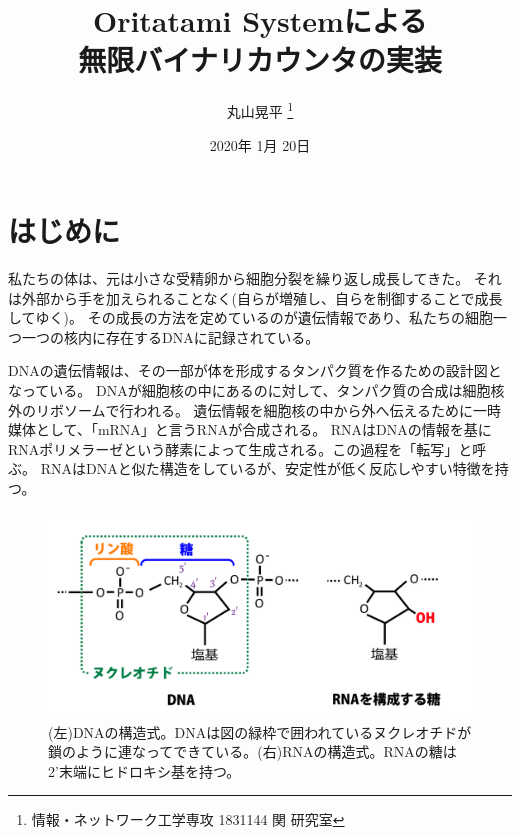 \documentclass[a4,11pt]{article}
\title{Oritatami Systemによる\\無限バイナリカウンタの実装}
\author{丸山晃平
\thanks{情報・ネットワーク工学専攻 1831144 関 研究室}
}
\date{2020年 1月 20日}%
\begin{document}
\maketitle

\thispagestyle{empty}
\newpage
\tableofcontents
\newpage

\section{はじめに}
%

私たちの体は、元は小さな受精卵から細胞分裂を繰り返し成長してきた。
それは外部から手を加えられることなく(自らが増殖し、自らを制御することで成長してゆく)。
その成長の方法を定めているのが遺伝情報であり、私たちの細胞一つ一つの核内に存在するDNAに記録されている。

DNAの遺伝情報は、その一部が体を形成するタンパク質を作るための設計図となっている。
DNAが細胞核の中にあるのに対して、タンパク質の合成は細胞核外のリボソームで行われる。
遺伝情報を細胞核の中から外へ伝えるために一時媒体として、「mRNA」と言うRNAが合成される。
RNAはDNAの情報を基にRNAポリメラーゼという酵素によって生成される。この過程を「転写」と呼ぶ。
RNAはDNAと似た構造をしているが、安定性が低く反応しやすい特徴を持つ。

\begin{figure}[h]
  \centering
  \includegraphics[width=\textwidth]{fig/dnarna.png}
  \caption{(左)DNAの構造式。DNAは図の緑枠で囲われているヌクレオチドが鎖のように連なってできている。(右)RNAの構造式。RNAの糖は2'末端にヒドロキシ基を持つ。}
  \label{dnarna}
\end{figure}
\end{document}
